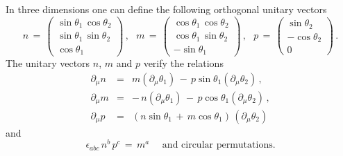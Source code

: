 \documentclass[a4paper,a4paper]{article}
\begin{document}
In three dimensions one can define the following orthogonal unitary vectors
\begin{equation}
   n \, = \, \left( \begin{array}{c}
                     \sin \theta_1 \, \cos \theta_2  \\
                     \sin \theta_1 \, \sin \theta_2  \\
                     \cos \theta_1
                    \end{array}
             \right) \, , \mbox{    }
   m \, = \, \left( \begin{array}{c}
                     \cos \theta_1 \, \cos \theta_2  \\
                     \cos \theta_1 \, \sin \theta_2  \\
                     -\sin \theta_1
                    \end{array}
             \right) \, ,  \mbox{    }
   p \, = \, \left( \begin{array}{c}
                     \sin \theta_2  \\
                     - \cos \theta_2  \\
                       0
                    \end{array}
             \right) \, .
\end{equation}
The unitary vectors $n$, $m$ and $p$ verify the relations
\begin{eqnarray}
 \partial_\mu n & = & m \left( \partial_\mu \theta_1 \right) \, - \, 
                        p \sin \theta_1 
                          \left( \partial_\mu \theta_2 \right) \, ,
 \\
 \partial_\mu m & = & - \, n \left( \partial_\mu \theta_1 \right) \, - \, 
                        p \cos \theta_1
                          \left( \partial_\mu \theta_2 \right) \, ,
 \\
 \partial_\mu p & = & \left( n \sin \theta_1 \, + \, 
                              m \cos \theta_1 \right) \, 
                       \left( \partial_\mu \theta_2 \right)
\end{eqnarray}
and
\begin{equation}
 \epsilon_{abc} \, n^b \, p^c \, = \, m^a \,\,\,\,\,\,
 \mbox{         and circular permutations.}
\end{equation}
\end{document}

